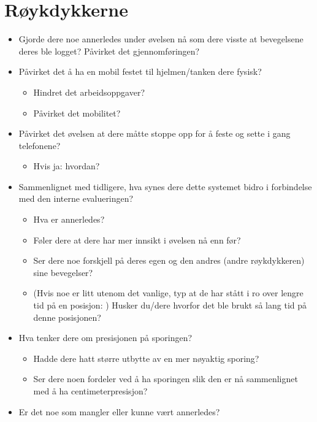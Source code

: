 \documentclass[../Main/thesis.tex]{subfiles}
\begin{document}
\section*{Røykdykkerne}
\begin{itemize}
	\item Gjorde dere noe annerledes under øvelsen nå som dere visste at bevegelsene deres ble logget? Påvirket det gjennomføringen?
	\item Påvirket det å ha en mobil festet til hjelmen/tanken dere fysisk?
\begin{itemize}
	\item Hindret det arbeidsoppgaver?
	\item Påvirket det mobilitet?
\end{itemize}
\item Påvirket det øvelsen at dere måtte stoppe opp for å feste og sette i gang telefonene?
\begin{itemize}
	\item Hvis ja: hvordan?
\end{itemize}
\item Sammenlignet med tidligere, hva synes dere dette systemet bidro i forbindelse med den interne evalueringen?
\begin{itemize}
	\item Hva er annerledes?
	\item Føler dere at dere har mer innsikt i øvelsen nå enn før?
	\item Ser dere noe forskjell på deres egen og den andres (andre røykdykkeren) sine bevegelser?
	\item (Hvis noe er litt utenom det vanlige, typ at de har stått i ro over lengre tid på en posisjon: ) Husker du/dere hvorfor det ble brukt så lang tid på denne posisjonen?
\end{itemize}
\item Hva tenker dere om presisjonen på sporingen?
\begin{itemize}
	\item Hadde dere hatt større utbytte av en mer nøyaktig sporing?
	\item Ser dere noen fordeler ved å ha sporingen slik den er nå sammenlignet med å ha centimeterpresisjon?
\end{itemize}
\item Er det noe som mangler eller kunne vært annerledes?
\end{itemize}
\end{document}
